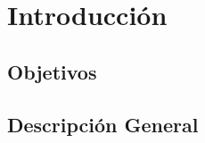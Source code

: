 \chapter{Introducción}
\label{chap:introduccion}

\section{Objetivos}

\section{Descripción General}
